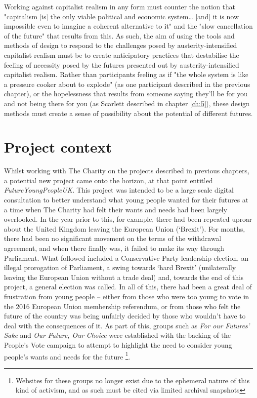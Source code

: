 Working against capitalist realism in any form must counter the notion that "capitalism [is] the only viable political and economic system\ldots{} [and] it is now impossible even to imagine a coherent alternative to it" \citep[p. 2]{fisher_capitalist_2009} and the "slow cancellation of the future" \citep[p. 5]{fisher_ghosts_2014} that results from this. As such, the aim of using the tools and methods of design to respond to the challenges posed by austerity-intensified capitalist realism must be to create anticipatory practices that destabilise the feeling of necessity posed by the futures presented out by austerity-intensified capitalist realism. Rather than participants feeling as if "the whole system is like a pressure cooker about to explode" (as one participant described in the previous chapter), or the hopelessness that results from someone saying they'll be for you and not being there for you (as Scarlett described in chapter \ref{ch:5}), these design methods must create a sense of possibility about the potential of different futures.

\section{Project context}

Whilst working with The Charity on the projects described in previous chapters, a potential new project came onto the horizon, at that point entitled \textit{FutureYoungPeopleUK}. This project was intended to be a large scale digital consultation to better understand what young people wanted for their futures at a time when The Charity had felt their wants and needs had been largely overlooked. In the year prior to this, for example, there had been repeated uproar about the United Kingdom leaving the European Union (`Brexit’). For months, there had been no significant movement on the terms of the withdrawal agreement, and when there finally was, it failed to make its way through Parliament. What followed included a Conservative Party leadership election, an illegal prorogation of Parliament, a swing towards `hard Brexit’ (unilaterally leaving the European Union without a trade deal) and, towards the end of this project, a general election was called. In all of this, there had been a great deal of frustration from young people – either from those who were too young to vote in the 2016 European Union membership referendum, or from those who felt the future of the country was being unfairly decided by those who wouldn’t have to deal with the consequences of it. As part of this, groups such as \emph{For our Futures’ Sake} and \emph{Our Future, Our Choice} were established with the backing of the People’s Vote campaign to attempt to highlight the need to consider young people’s wants and needs for the future \citep{for_our_futures_sake_for_2019} \footnote{Websites for these groups no longer exist due to the ephemeral nature of this kind of activism, and as such must be cited via limited archival snapshots}.

